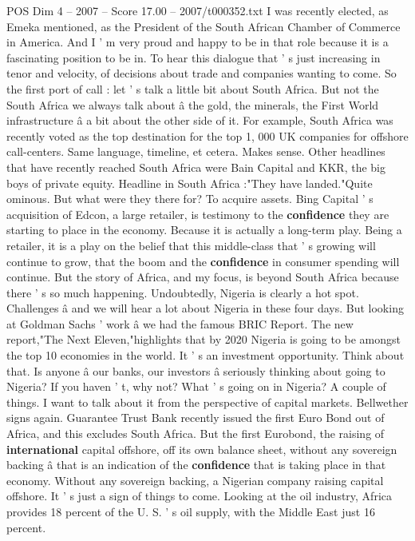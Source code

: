 \begin{textsample}{POS Dim 4 – 2007 – Score 17.00 – 2007/t000352.txt}
I was recently elected, as Emeka mentioned, as the President of the South African Chamber of Commerce in America.
And I ' m very proud and happy to be in that role because it is a fascinating position to be in.
To hear this dialogue that ' s just increasing in tenor and velocity, of decisions about trade and companies wanting to come.
So the first port of call : let ' s talk a little bit about South Africa.
But not the South Africa we always talk about â the gold, the minerals, the First World infrastructure â a bit about the other side of it.
For example, South Africa was recently voted as the top destination for the top 1, 000 UK companies for offshore call-centers.
Same language, timeline, et cetera.
Makes sense.
Other headlines that have recently reached South Africa were Bain Capital and KKR, the big boys of private equity.
Headline in South Africa :"They have landed."Quite ominous.
But what were they there for?
To acquire assets.
Bing Capital ' s acquisition of Edcon, a large retailer, is testimony to the \textbf{confidence} they are starting to place in the economy.
Because it is actually a long-term play.
Being a retailer, it is a play on the belief that this middle-class that ' s growing will continue to grow, that the boom and the \textbf{confidence} in consumer spending will continue.
But the story of Africa, and my focus, is beyond South Africa because there ' s so much happening.
Undoubtedly, Nigeria is clearly a hot spot.
Challenges â and we will hear a lot about Nigeria in these four days.
But looking at Goldman Sachs ' work â we had the famous BRIC Report.
The new report,"The Next Eleven,"highlights that by 2020 Nigeria is going to be amongst the top 10 economies in the world.
It ' s an investment opportunity.
Think about that.
Is anyone â our banks, our investors â seriously thinking about going to Nigeria?
If you haven ' t, why not?
What ' s going on in Nigeria?
A couple of things.
I want to talk about it from the perspective of capital markets.
Bellwether signs again.
Guarantee Trust Bank recently issued the first Euro Bond out of Africa, and this excludes South Africa.
But the first Eurobond, the raising of \textbf{international} capital offshore, off its own balance sheet, without any sovereign backing â that is an indication of the \textbf{confidence} that is taking place in that economy.
Without any sovereign backing, a Nigerian company raising capital offshore.
It ' s just a sign of things to come.
Looking at the oil industry, Africa provides 18 percent of the U.
S. ' s oil supply, with the Middle East just 16 percent.

\end{textsample}
